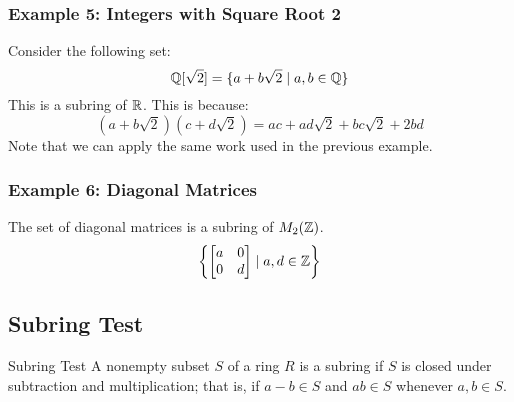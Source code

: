 \documentclass[letterpaper]{article}
\begin{document}
\subsubsection{Example 5: Integers with Square Root 2}
Consider the following set: 
\[\mathbb{Q}[\sqrt{2}] = \{a + b\sqrt{2} \mid a, b \in \mathbb{Q}\}\]
This is a subring of $\mathbb{R}$. This is because: 
\[(a + b\sqrt{2})(c + d\sqrt{2}) = ac + ad\sqrt{2} + bc\sqrt{2} + 2bd\]
Note that we can apply the same work used in the previous example. 

\subsubsection{Example 6: Diagonal Matrices}
The set of diagonal matrices is a subring of $M_{2}(\mathbb{Z})$. 
\[\left\{\begin{bmatrix}
    a & 0 \\ 0 & d
\end{bmatrix} \mid a, d \in \mathbb{Z}\right\}\]

\subsection{Subring Test}
\begin{theorem}{Subring Test}{}
    A nonempty subset $S$ of a ring $R$ is a subring if $S$ is closed under subtraction and multiplication; that is, if $a - b \in S$ and $ab \in S$ whenever $a, b \in S$. 
\end{theorem}
\end{document}

